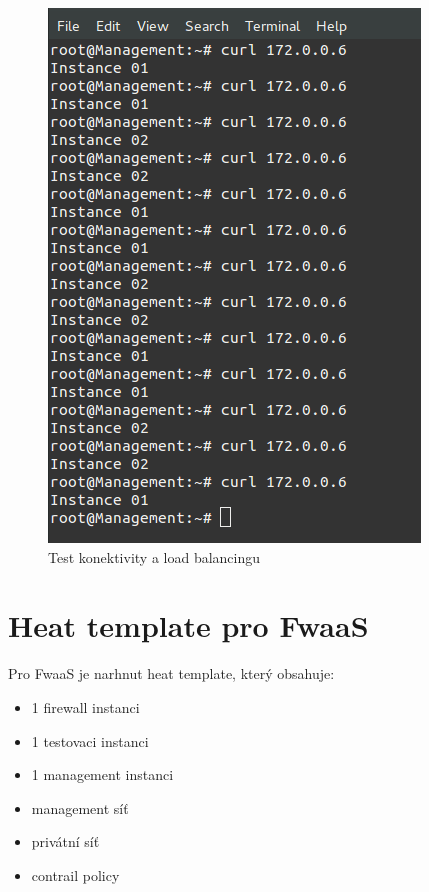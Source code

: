 \begin{figure}[h]
\begin{centering}
\includegraphics[scale=0.45]{images/lbaas_testing}
\par\end{centering}
\caption{Test konektivity a load balancingu\label{fig:lbaas_testing}}
\end{figure}


\section{Heat template pro FwaaS}\label{sub:interaction}

Pro FwaaS je narhnut heat template, který obsahuje:

\begin{itemize}
\item 1 firewall instanci
\item 1 testovaci instanci
\item 1 management instanci
\item management síť
\item privátní síť
\item contrail policy
\end{itemize}


